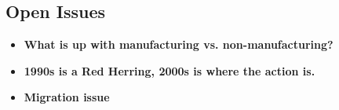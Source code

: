 \documentclass[pdftex,12pt]{article}
\begin{document}
\subsection{Open Issues}

\begin{itemize}
\item \textbf{What is up with manufacturing vs. non-manufacturing?}

\item \textbf{1990s is a Red Herring, 2000s is where the action is.}

\item \textbf{Migration issue}
\end{itemize}



\small

\end{document}
